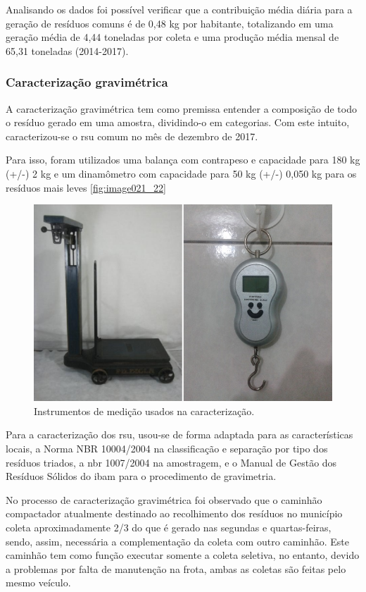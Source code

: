 	
	Analisando os dados foi possível verificar que a contribuição média diária para a geração de resíduos comuns é de 0,48 kg por habitante, totalizando em uma geração média de 4,44 toneladas por coleta e uma produção média mensal de 65,31 toneladas (2014-2017).
	
	\subsubsection{Caracterização gravimétrica} 	
	\label{subsubsec:gravimetria_comum}

	A caracterização gravimétrica tem como premissa entender a composição de todo o resíduo gerado em uma amostra, dividindo-o em categorias. Com este intuito, caracterizou-se o \gls{rsu} comum no mês de dezembro de 2017.
	
	Para isso, foram utilizados uma balança com contrapeso e capacidade para 180 kg (+/-) 2 kg e um dinamômetro com capacidade para 50 kg (+/-) 0,050 kg para os resíduos mais leves \autoref{fig:image021_22}
	
	\begin{figure}
		\centering
		\includegraphics[width=0.7\linewidth]{produtos/prodtres/image021_22}
		\caption{Instrumentos de medição usados na caracterização.}
		\label{fig:image021_22}
	\end{figure}

	Para a caracterização dos \gls{rsu}, usou-se de forma adaptada para as características locais, a Norma NBR 10004/2004 na classificação e separação por tipo dos resíduos triados, a \gls{nbr} 1007/2004 na amostragem, e o Manual de Gestão dos Resíduos Sólidos do \gls{ibam} para o procedimento de gravimetria.
	
	No processo de caracterização gravimétrica foi observado que o caminhão compactador atualmente destinado ao recolhimento dos resíduos no município coleta aproximadamente 2/3 do que é gerado nas segundas e quartas-feiras, sendo, assim, necessária a complementação da coleta com outro caminhão. Este caminhão tem como função executar somente a coleta seletiva, no entanto, devido a problemas por falta de manutenção na frota, ambas as coletas são feitas pelo mesmo veículo.
	
